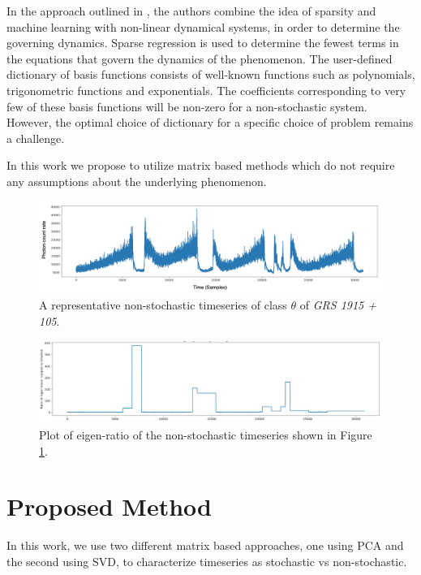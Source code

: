 \documentclass[10pt,conference]{IEEEtran}
\begin{document}
In the approach outlined in \cite{Brunton2016}, the authors combine the idea of sparsity and machine learning with non-linear dynamical systems, in order to determine the governing dynamics. Sparse regression is used to determine the fewest terms in the equations that govern the dynamics of the phenomenon. The user-defined dictionary of basis functions consists of well-known functions such as polynomials, trigonometric functions and exponentials. The coefficients corresponding to very few of these basis functions will be non-zero for a non-stochastic system. However, the optimal choice of dictionary for a specific choice of problem remains a challenge.

In this work we propose to utilize matrix based methods which do not require any assumptions about the underlying phenomenon.

\begin{figure}[ht]
  \centering
  \includegraphics[width=0.8\linewidth]{theta_ts_edited.drawio.png}
  \caption{A representative non-stochastic timeseries of class $\theta$ of \textit{GRS 1915 + 105}. }
  \label{theta_ts}
\end{figure}
\begin{figure}[ht]
  \centering
  \includegraphics[width=0.8\linewidth]{theta_ts_eig.png}
  \caption{Plot of eigen-ratio of the  non-stochastic timeseries shown in Figure \ref{theta_ts}. }
  \label{theta_eig}
\end{figure}

\section{Proposed Method}
In this work, we use two different matrix based approaches, one using PCA and the second using SVD, to characterize timeseries as stochastic vs non-stochastic.
\end{document}
